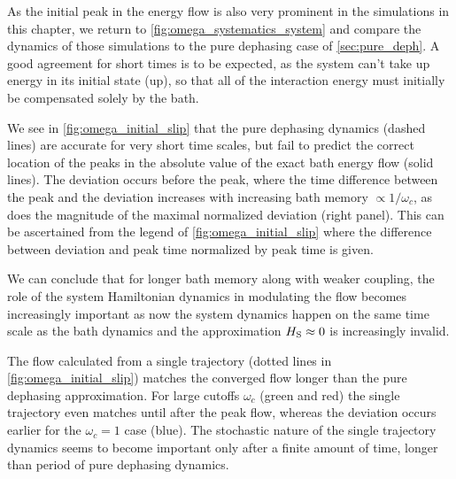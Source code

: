As the initial peak in the energy flow is also very prominent in the
simulations in this chapter, we return to
\cref{fig:omega_systematics_system} and compare the dynamics of those
simulations to the pure dephasing case of \cref{sec:pure_deph}. A good
agreement for short times is to be expected, as the system can't take
up energy in its initial state (up), so that all of the interaction
energy must initially be compensated solely by the bath.

We see in \cref{fig:omega_initial_slip} that the pure dephasing
dynamics (dashed lines) are accurate for very short time scales, but
fail to predict the correct location of the peaks in the absolute
value of the exact bath energy flow (solid lines).  The deviation
occurs before the peak, where the time difference between the peak and
the deviation increases with increasing bath memory \(\propto 1/ω_c\),
as does the magnitude of the maximal normalized deviation (right
panel). This can be ascertained from the legend of
\cref{fig:omega_initial_slip} where the difference between deviation
and peak time normalized by peak time is given.

We can conclude that for longer bath memory along with weaker
coupling, the role of the system Hamiltonian dynamics in modulating
the flow becomes increasingly important as now the system dynamics
happen on the same time scale as the bath dynamics and the
approximation \(H_{\mathrm{S}}\approx 0\) is increasingly invalid.

The flow calculated from a single trajectory (dotted lines in
\cref{fig:omega_initial_slip}) matches the converged flow longer than
the pure dephasing approximation. For large cutoffs \(ω_{c}\) (green
and red) the single trajectory even matches until after the peak flow,
whereas the deviation occurs earlier for the \(ω_{c}=1\) case
(blue). The stochastic nature of the single trajectory dynamics seems
to become important only after a finite amount of time, longer than
period of pure dephasing dynamics.

